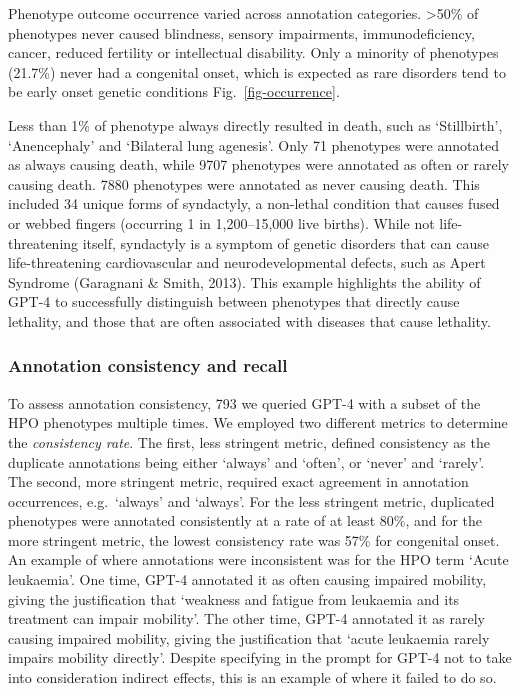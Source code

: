 \documentclass[
]{agujournal2019}
\begin{document}
Phenotype outcome occurrence varied across annotation categories.
\textgreater50\% of phenotypes never caused blindness, sensory
impairments, immunodeficiency, cancer, reduced fertility or intellectual
disability. Only a minority of phenotypes (21.7\%) never had a
congenital onset, which is expected as rare disorders tend to be early
onset genetic conditions Fig.~\ref{fig-occurrence}.

Less than 1\% of phenotype always directly resulted in death, such as
`Stillbirth', `Anencephaly' and `Bilateral lung agenesis'. Only 71
phenotypes were annotated as always causing death, while 9707 phenotypes
were annotated as often or rarely causing death. 7880 phenotypes were
annotated as never causing death. This included 34 unique forms of
syndactyly, a non-lethal condition that causes fused or webbed fingers
(occurring 1 in 1,200--15,000 live births). While not life-threatening
itself, syndactyly is a symptom of genetic disorders that can cause
life-threatening cardiovascular and neurodevelopmental defects, such as
Apert Syndrome (Garagnani \& Smith, 2013). This example highlights the
ability of GPT-4 to successfully distinguish between phenotypes that
directly cause lethality, and those that are often associated with
diseases that cause lethality.

\subsubsection{Annotation consistency and
recall}\label{annotation-consistency-and-recall}

To assess annotation consistency, 793 we queried GPT-4 with a subset of
the HPO phenotypes multiple times. We employed two different metrics to
determine the \emph{consistency rate}. The first, less stringent metric,
defined consistency as the duplicate annotations being either `always'
and `often', or `never' and `rarely'. The second, more stringent metric,
required exact agreement in annotation occurrences, e.g.~`always' and
`always'. For the less stringent metric, duplicated phenotypes were
annotated consistently at a rate of at least 80\%, and for the more
stringent metric, the lowest consistency rate was 57\% for congenital
onset. An example of where annotations were inconsistent was for the HPO
term `Acute leukaemia'. One time, GPT-4 annotated it as often causing
impaired mobility, giving the justification that `weakness and fatigue
from leukaemia and its treatment can impair mobility'. The other time,
GPT-4 annotated it as rarely causing impaired mobility, giving the
justification that `acute leukaemia rarely impairs mobility directly'.
Despite specifying in the prompt for GPT-4 not to take into
consideration indirect effects, this is an example of where it failed to
do so.
\end{document}
